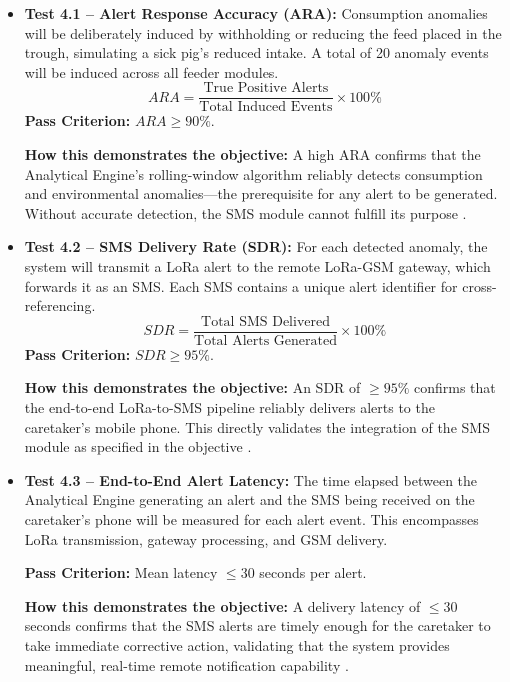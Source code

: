 \begin{itemize}
  \item \textbf{Test 4.1 -- Alert Response Accuracy (ARA):} Consumption anomalies will be deliberately induced by withholding or reducing the feed placed in the trough, simulating a sick pig's reduced intake. A total of 20 anomaly events will be induced across all feeder modules.
    \begin{equation}
      ARA = \frac{\text{True Positive Alerts}}{\text{Total Induced Events}} \times 100\%
    \end{equation}
    \textbf{Pass Criterion:} $ARA \geq 90\%$.

    \textbf{How this demonstrates the objective:} A high ARA confirms that the Analytical Engine's rolling-window algorithm reliably detects consumption and environmental anomalies---the prerequisite for any alert to be generated. Without accurate detection, the SMS module cannot fulfill its purpose \cite{sadeghi2023improving,racewicz2021welfare}.

  \item \textbf{Test 4.2 -- SMS Delivery Rate (SDR):} For each detected anomaly, the system will transmit a LoRa alert to the remote LoRa-GSM gateway, which forwards it as an SMS. Each SMS contains a unique alert identifier for cross-referencing.
    \begin{equation}
      SDR = \frac{\text{Total SMS Delivered}}{\text{Total Alerts Generated}} \times 100\%
    \end{equation}
    \textbf{Pass Criterion:} $SDR \geq 95\%$.

    \textbf{How this demonstrates the objective:} An SDR of $\geq 95\%$ confirms that the end-to-end LoRa-to-SMS pipeline reliably delivers alerts to the caretaker's mobile phone. This directly validates the integration of the SMS module as specified in the objective \cite{beyondtech2025smart,reza2025review}.

  \item \textbf{Test 4.3 -- End-to-End Alert Latency:} The time elapsed between the Analytical Engine generating an alert and the SMS being received on the caretaker's phone will be measured for each alert event. This encompasses LoRa transmission, gateway processing, and GSM delivery.

    \textbf{Pass Criterion:} Mean latency $\le 30$ seconds per alert.

    \textbf{How this demonstrates the objective:} A delivery latency of $\le 30$ seconds confirms that the SMS alerts are timely enough for the caretaker to take immediate corrective action, validating that the system provides meaningful, real-time remote notification capability \cite{beyondtech2025smart,reza2025review}.


\end{itemize}
